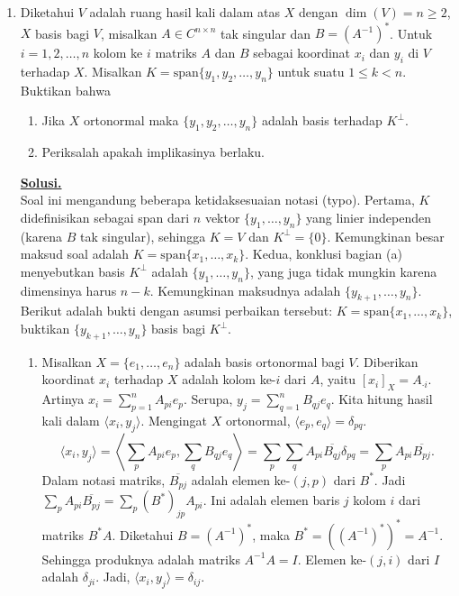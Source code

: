 \documentclass[12pt,twoside]{article}
\newenvironment{solution}
{
	\par\noindent\textbf{\underline{Solusi.}}\\
}
{
	\par
}
\begin{document}
\begin{enumerate}
  \item Diketahui $V$ adalah ruang hasil kali dalam atas $X$ dengan $\dim(V)=n\geq 2$, $X$ basis bagi $V$, misalkan $A\in C^{n\times n}$ tak singular dan $B=(A^{-1})^{*}$. Untuk $i=1,2,\dots,n$ kolom ke $i$ matriks $A$ dan $B$ sebagai koordinat $x_i$ dan $y_i$ di $V$ terhadap $X$. Misalkan $K=\text{span} \{y_1,y_2,\dots,y_n\}$ untuk suatu $1\leq k<n$. Buktikan bahwa
        \begin{enumerate}
          \item [(a)] Jika $X$ ortonormal maka $\{y_1,y_2,\dots,y_n\}$ adalah basis terhadap $K^{\bot}$.
          \item[(b)] Periksalah apakah implikasinya berlaku.
        \end{enumerate}
        \begin{solution}
          Soal ini mengandung beberapa ketidaksesuaian notasi (typo).
          Pertama, $K$ didefinisikan sebagai span dari $n$ vektor $\{y_1, \dots, y_n\}$ yang linier independen (karena $B$ tak singular), sehingga $K=V$ dan $K^\perp = \{0\}$. Kemungkinan besar maksud soal adalah $K = \text{span}\{x_1, \dots, x_k\}$.
          Kedua, konklusi bagian (a) menyebutkan basis $K^\perp$ adalah $\{y_1, \dots, y_n\}$, yang juga tidak mungkin karena dimensinya harus $n-k$. Kemungkinan maksudnya adalah $\{y_{k+1}, \dots, y_n\}$.
          Berikut adalah bukti dengan asumsi perbaikan tersebut: $K = \text{span}\{x_1, \dots, x_k\}$, buktikan $\{y_{k+1}, \dots, y_n\}$ basis bagi $K^\perp$.

          \begin{enumerate}
            \item[(a)] Misalkan $X = \{e_1, \dots, e_n\}$ adalah basis ortonormal bagi $V$.
                  Diberikan koordinat $x_i$ terhadap $X$ adalah kolom ke-$i$ dari $A$, yaitu $[x_i]_X = A_{\cdot i}$.
                  Artinya $x_i = \sum_{p=1}^n A_{pi} e_p$.
                  Serupa, $y_j = \sum_{q=1}^n B_{qj} e_q$.
                  Kita hitung hasil kali dalam $\langle x_i, y_j \rangle$. Mengingat $X$ ortonormal, $\langle e_p, e_q \rangle = \delta_{pq}$.
                  $$ \langle x_i, y_j \rangle = \left\langle \sum_p A_{pi} e_p, \sum_q B_{qj} e_q \right\rangle = \sum_p \sum_q A_{pi} \overline{B_{qj}} \delta_{pq} = \sum_p A_{pi} \overline{B_{pj}}. $$
                  Dalam notasi matriks, $\overline{B_{pj}}$ adalah elemen ke-$(j,p)$ dari $B^*$.
                  Jadi $\sum_p A_{pi} \overline{B_{pj}} = \sum_p (B^*)_{jp} A_{pi}$.
                  Ini adalah elemen baris $j$ kolom $i$ dari matriks $B^* A$.
                  Diketahui $B = (A^{-1})^*$, maka $B^* = ((A^{-1})^*)^* = A^{-1}$.
                  Sehingga produknya adalah matriks $A^{-1} A = I$.
                  Elemen ke-$(j,i)$ dari $I$ adalah $\delta_{ji}$.
                  Jadi, $\langle x_i, y_j \rangle = \delta_{ij}$.


\end{enumerate}
\end{solution}
\end{enumerate}
\end{document}
